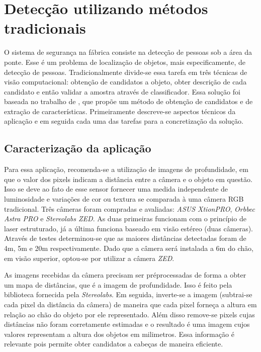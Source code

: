\chapter{Detecção utilizando métodos tradicionais} \label{chap:tradicional}

O sistema de segurança na fábrica consiste na detecção de pessoas sob a área da ponte. Esse é um problema de localização de objetos, mais especificamente, de detecção de pessoas. Tradicionalmente divide-se essa tarefa em três técnicas de visão computacional: obtenção de candidatos a objeto, obter descrição de cada candidato e então validar a amostra através de classificador. Essa solução foi baseada no trabalho de \cite{rauter}, que propõe um método de obtenção de candidatos e de extração de características. Primeiramente descreve-se aspectos técnicos da aplicação e em seguida cada uma das tarefas para a concretização da solução.

\section{Caracterização da aplicação}
Para essa aplicação, recomenda-se a utilização de imagens de profundidade, em que o valor dos pixels indicam a distância entre a câmera e o objeto em questão. Isso se deve ao fato de esse sensor fornecer uma medida independente de luminosidade e variações de cor ou textura se comparada à uma câmera RGB tradicional. Três câmeras foram compradas e avaliadas: \textit{ASUS XtionPRO}, \textit{Orbbec Astra PRO} e \textit{Stereolabs ZED}. As duas primeiras funcionam com o princípio de laser estruturado, já a última funciona baseado em visão estéreo (duas câmeras). Através de testes determinou-se que as maiores distâncias detectadas foram de 4m, 5m e 20m respectivamente. Dado que a câmera será instalada a 6m do chão, em visão superior, optou-se por utilizar a câmera \textit{ZED}.

As imagens recebidas da câmera precisam ser préprocessadas de forma a obter um mapa de distâncias, que é a imagem de profundidade. Isso é feito pela biblioteca fornecida pela \textit{Stereolabs}. Em seguida, inverte-se a imagem (subtrai-se cada pixel da distância da câmera) de maneira que cada pixel forneça a altura em relação ao chão do objeto por ele representado. Além disso remove-se pixels cujas distâncias não foram corretamente estimadas e o resultado é uma imagem cujos valores representam a altura dos objetos em milimetros. Essa informação é relevante pois permite obter candidatos a cabeças de maneira eficiente.

